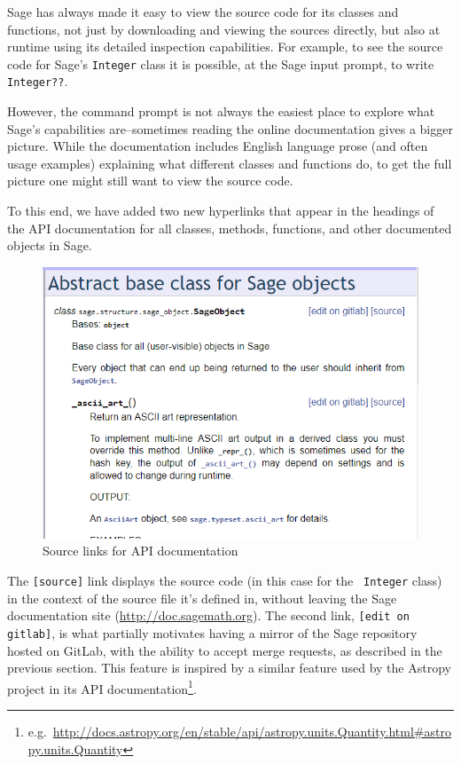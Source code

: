 {Sage has always made it easy to view the source code for its classes and
functions, not just by downloading and viewing the sources directly, but
also at runtime using its detailed inspection capabilities.  For example, to
see the source code for Sage's {\tt Integer} class it is possible, at the
Sage input prompt, to write {\tt Integer??}.

However, the command prompt is not always the easiest place to explore what
Sage's capabilities are--sometimes reading the online documentation gives a
bigger picture.  While the documentation includes English language prose (and
often usage examples) explaining what different classes and functions do, to
get the full picture one might still want to view the source code.

To this end, we have added two new hyperlinks that appear in the headings of
the API documentation for all classes, methods, functions, and other documented
objects in Sage.

\begin{figure}[!ht]
    \centering
    \includegraphics{screenshots/source-links}
    \caption{Source links for API documentation}
    \label{fig:source-links}
\end{figure}

The {\tt [source]} link displays the source code (in this case for the {\tt
Integer} class) in the context of the source file it's defined in, without
leaving the Sage documentation site (\url{http://doc.sagemath.org}).  The
second link, {\tt [edit on gitlab]}, is what partially motivates having a
mirror of the Sage repository hosted on GitLab, with the ability to accept
merge requests, as described in the previous section.  This feature is inspired
by a similar feature used by the Astropy project in its API
documentation\footnote{e.g.~\url{http://docs.astropy.org/en/stable/api/astropy.units.Quantity.html\#astropy.units.Quantity}}.

}
